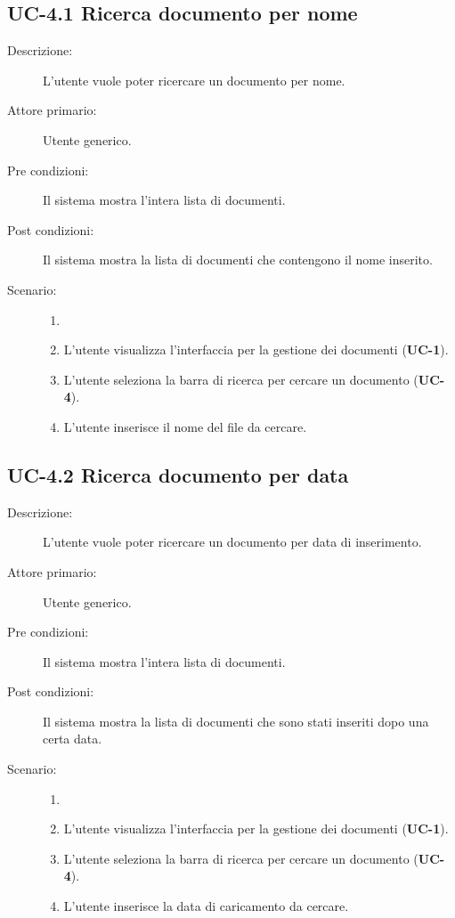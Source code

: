 \subsection{UC-4.1 Ricerca documento per nome}
\begin{description}
    \item[Descrizione:] L’utente vuole poter ricercare un documento per nome.
    \item[Attore primario:] Utente generico.
    \item[Pre condizioni:] Il sistema mostra l’intera lista di documenti.
    \item[Post condizioni:] Il sistema mostra la lista di documenti che contengono il nome inserito.
    \item[Scenario:] 
    \begin{enumerate}
        \item[] 
        \item L’utente visualizza l'interfaccia per la gestione dei documenti (\textbf{UC-1}).
        \item L’utente seleziona la barra di ricerca per cercare un documento (\textbf{UC-4}).
        \item L’utente inserisce il nome del file da cercare.
    \end{enumerate}
\end{description}

\subsection{UC-4.2 Ricerca documento per data}
\begin{description}
    \item[Descrizione:] L’utente vuole poter ricercare un documento per data di inserimento.
    \item[Attore primario:] Utente generico.
    \item[Pre condizioni:] Il sistema mostra l’intera lista di documenti.
    \item[Post condizioni:] Il sistema mostra la lista di documenti che sono stati inseriti dopo una certa data.
    \item[Scenario:] 
    \begin{enumerate}
        \item[] 
        \item L’utente visualizza l'interfaccia per la gestione dei documenti (\textbf{UC-1}).
        \item L’utente seleziona la barra di ricerca per cercare un documento (\textbf{UC-4}).
        \item L’utente inserisce la data di caricamento da cercare.
    \end{enumerate}
\end{description}

